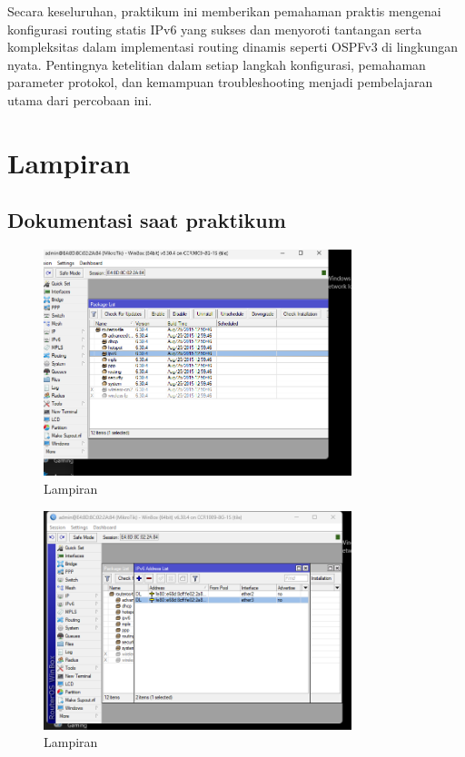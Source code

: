 Secara keseluruhan, praktikum ini memberikan pemahaman praktis mengenai konfigurasi routing statis IPv6 yang sukses dan menyoroti tantangan serta kompleksitas dalam implementasi routing dinamis seperti OSPFv3 di lingkungan nyata. Pentingnya ketelitian dalam setiap langkah konfigurasi, pemahaman parameter protokol, dan kemampuan troubleshooting menjadi pembelajaran utama dari percobaan ini.
\section{Lampiran}
\subsection{Dokumentasi saat praktikum}
\begin{figure}
    \centering
    \includegraphics[width=0.8\textwidth]{P1/img/dokum1.png}
    \caption{Lampiran}
    \label{fig:hasil_routing_dinamis_ipv6_3}
\end{figure}
\begin{figure}
    \centering
    \includegraphics[width=0.8\textwidth]{P1/img/dokum2.png}
    \caption{Lampiran}
    \label{fig:hasil_routing_dinamis_ipv6_4}
\end{figure}

